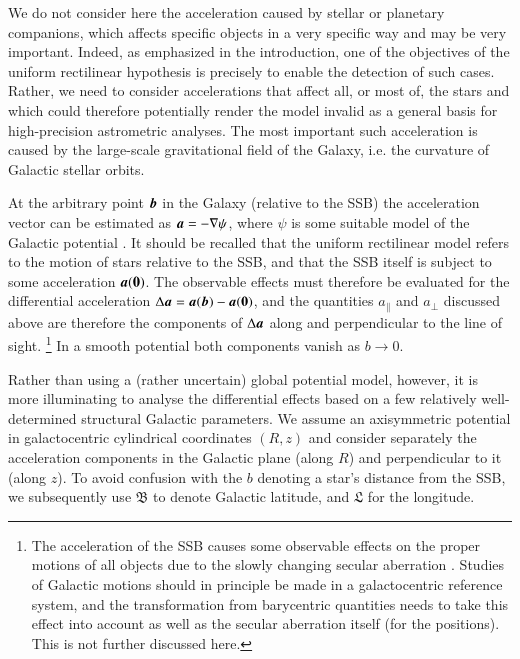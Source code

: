 \documentclass{aa}
\def\vec#1{\ensuremath{\mathchoice{\mbox{\boldmath$\displaystyle#1$}}
{\mbox{\boldmath$\textstyle#1$}}
{\mbox{\boldmath$\scriptstyle#1$}}
{\mbox{\boldmath$\scriptscriptstyle#1$}}}}
\newcommand{\glon}{\mathfrak{L}}
\newcommand{\glat}{\mathfrak{B}}
\begin{document}
We do not consider here the acceleration caused by stellar or planetary companions, which affects
specific objects in a very specific way and may be very important. Indeed, as emphasized in the
introduction, one of the objectives of the uniform rectilinear hypothesis is precisely to enable the
detection of such cases. Rather, we need to consider accelerations that affect all, or most of,
the stars and which could therefore potentially render the model invalid as a general basis for
high-precision astrometric analyses. The most important such acceleration is caused by the
large-scale gravitational field of the Galaxy, i.e. the curvature of Galactic stellar orbits.

At the arbitrary point $\vec{b}$ in the Galaxy (relative to the SSB) the acceleration vector can be
estimated as $\vec{a}=-\nabla\psi$, where $\psi$ is some suitable model of the Galactic
potential \citep{BT2}. It should be recalled that the uniform rectilinear model refers to the
motion of stars relative to the SSB, and that the SSB itself is subject to some acceleration
$\vec{a}(\vec{0})$. The observable effects must therefore be evaluated for the differential
acceleration $\Delta\vec{a}=\vec{a}(\vec{b})-\vec{a}(\vec{0})$, and the quantities $a_\parallel$ and
$a_\perp$ discussed above are therefore the components of $\Delta\vec{a}$ along and
perpendicular to the line of sight.%
\footnote{The acceleration of the SSB causes some observable effects on the proper motions
of all objects due to the slowly changing secular aberration
\citep{bastian1995, kovalevsky2003, liu+2013}. Studies of Galactic motions should in principle
be made in a galactocentric reference system, and the transformation from barycentric
quantities needs to take this effect into account as well as the secular aberration itself
(for the positions). This is not further discussed here.}
In a smooth potential both components vanish as $b\rightarrow 0$.

Rather than using a (rather uncertain) global potential model, however, it is more illuminating
to analyse the differential effects based on a few relatively well-determined structural Galactic
parameters. We assume an axisymmetric potential in galactocentric cylindrical coordinates $(R,z)$
and consider separately the acceleration components in the Galactic plane (along $R$) and
perpendicular to it (along $z$). To avoid confusion with the $b$ denoting a star's distance
from the SSB, we subsequently use $\glat$ to denote Galactic latitude, and $\glon$ for the longitude.
\end{document}
